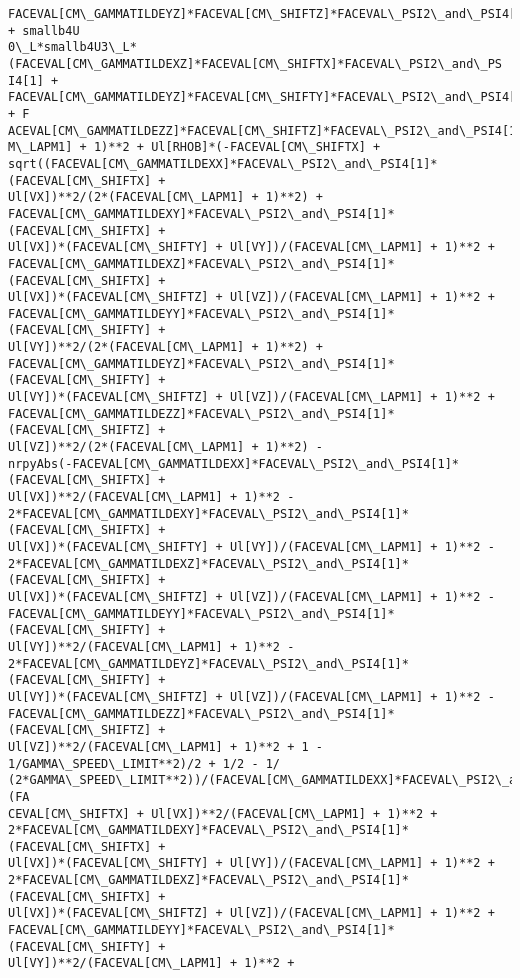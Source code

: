 \documentclass[landscape,letterpaper,10pt,english]{article}
\begin{document}
\begin{Verbatim}[commandchars=\\\{\}]
FACEVAL[CM\_GAMMATILDEYZ]*FACEVAL[CM\_SHIFTZ]*FACEVAL\_PSI2\_and\_PSI4[1]) + smallb4U
0\_L*smallb4U3\_L*(FACEVAL[CM\_GAMMATILDEXZ]*FACEVAL[CM\_SHIFTX]*FACEVAL\_PSI2\_and\_PS
I4[1] + FACEVAL[CM\_GAMMATILDEYZ]*FACEVAL[CM\_SHIFTY]*FACEVAL\_PSI2\_and\_PSI4[1] + F
ACEVAL[CM\_GAMMATILDEZZ]*FACEVAL[CM\_SHIFTZ]*FACEVAL\_PSI2\_and\_PSI4[1]))/(FACEVAL[C
M\_LAPM1] + 1)**2 + Ul[RHOB]*(-FACEVAL[CM\_SHIFTX] +
sqrt((FACEVAL[CM\_GAMMATILDEXX]*FACEVAL\_PSI2\_and\_PSI4[1]*(FACEVAL[CM\_SHIFTX] +
Ul[VX])**2/(2*(FACEVAL[CM\_LAPM1] + 1)**2) +
FACEVAL[CM\_GAMMATILDEXY]*FACEVAL\_PSI2\_and\_PSI4[1]*(FACEVAL[CM\_SHIFTX] +
Ul[VX])*(FACEVAL[CM\_SHIFTY] + Ul[VY])/(FACEVAL[CM\_LAPM1] + 1)**2 +
FACEVAL[CM\_GAMMATILDEXZ]*FACEVAL\_PSI2\_and\_PSI4[1]*(FACEVAL[CM\_SHIFTX] +
Ul[VX])*(FACEVAL[CM\_SHIFTZ] + Ul[VZ])/(FACEVAL[CM\_LAPM1] + 1)**2 +
FACEVAL[CM\_GAMMATILDEYY]*FACEVAL\_PSI2\_and\_PSI4[1]*(FACEVAL[CM\_SHIFTY] +
Ul[VY])**2/(2*(FACEVAL[CM\_LAPM1] + 1)**2) +
FACEVAL[CM\_GAMMATILDEYZ]*FACEVAL\_PSI2\_and\_PSI4[1]*(FACEVAL[CM\_SHIFTY] +
Ul[VY])*(FACEVAL[CM\_SHIFTZ] + Ul[VZ])/(FACEVAL[CM\_LAPM1] + 1)**2 +
FACEVAL[CM\_GAMMATILDEZZ]*FACEVAL\_PSI2\_and\_PSI4[1]*(FACEVAL[CM\_SHIFTZ] +
Ul[VZ])**2/(2*(FACEVAL[CM\_LAPM1] + 1)**2) -
nrpyAbs(-FACEVAL[CM\_GAMMATILDEXX]*FACEVAL\_PSI2\_and\_PSI4[1]*(FACEVAL[CM\_SHIFTX] +
Ul[VX])**2/(FACEVAL[CM\_LAPM1] + 1)**2 -
2*FACEVAL[CM\_GAMMATILDEXY]*FACEVAL\_PSI2\_and\_PSI4[1]*(FACEVAL[CM\_SHIFTX] +
Ul[VX])*(FACEVAL[CM\_SHIFTY] + Ul[VY])/(FACEVAL[CM\_LAPM1] + 1)**2 -
2*FACEVAL[CM\_GAMMATILDEXZ]*FACEVAL\_PSI2\_and\_PSI4[1]*(FACEVAL[CM\_SHIFTX] +
Ul[VX])*(FACEVAL[CM\_SHIFTZ] + Ul[VZ])/(FACEVAL[CM\_LAPM1] + 1)**2 -
FACEVAL[CM\_GAMMATILDEYY]*FACEVAL\_PSI2\_and\_PSI4[1]*(FACEVAL[CM\_SHIFTY] +
Ul[VY])**2/(FACEVAL[CM\_LAPM1] + 1)**2 -
2*FACEVAL[CM\_GAMMATILDEYZ]*FACEVAL\_PSI2\_and\_PSI4[1]*(FACEVAL[CM\_SHIFTY] +
Ul[VY])*(FACEVAL[CM\_SHIFTZ] + Ul[VZ])/(FACEVAL[CM\_LAPM1] + 1)**2 -
FACEVAL[CM\_GAMMATILDEZZ]*FACEVAL\_PSI2\_and\_PSI4[1]*(FACEVAL[CM\_SHIFTZ] +
Ul[VZ])**2/(FACEVAL[CM\_LAPM1] + 1)**2 + 1 - 1/GAMMA\_SPEED\_LIMIT**2)/2 + 1/2 - 1/
(2*GAMMA\_SPEED\_LIMIT**2))/(FACEVAL[CM\_GAMMATILDEXX]*FACEVAL\_PSI2\_and\_PSI4[1]*(FA
CEVAL[CM\_SHIFTX] + Ul[VX])**2/(FACEVAL[CM\_LAPM1] + 1)**2 +
2*FACEVAL[CM\_GAMMATILDEXY]*FACEVAL\_PSI2\_and\_PSI4[1]*(FACEVAL[CM\_SHIFTX] +
Ul[VX])*(FACEVAL[CM\_SHIFTY] + Ul[VY])/(FACEVAL[CM\_LAPM1] + 1)**2 +
2*FACEVAL[CM\_GAMMATILDEXZ]*FACEVAL\_PSI2\_and\_PSI4[1]*(FACEVAL[CM\_SHIFTX] +
Ul[VX])*(FACEVAL[CM\_SHIFTZ] + Ul[VZ])/(FACEVAL[CM\_LAPM1] + 1)**2 +
FACEVAL[CM\_GAMMATILDEYY]*FACEVAL\_PSI2\_and\_PSI4[1]*(FACEVAL[CM\_SHIFTY] +
Ul[VY])**2/(FACEVAL[CM\_LAPM1] + 1)**2 +

\end{Verbatim}
\end{document}

